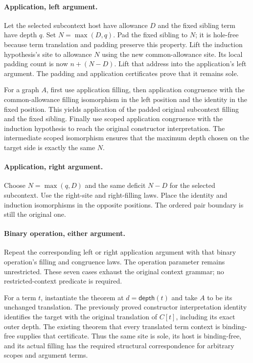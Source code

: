 \paragraph{Application, left argument.} Let the selected subcontext host have
allowance $D$ and the fixed sibling term have depth $q$. Set $N=\max(D,q)$.
Pad the fixed sibling to $N$; it is hole-free because term translation and
padding preserve this property. Lift the induction hypothesis's site to
allowance $N$ using the new common-allowance site. Its local padding count is
now $n+(N-D)$. Lift that address into the application's left argument. The
padding and application certificates prove that it remains sole.

For a graph $A$, first use application filling, then application congruence
with the common-allowance filling isomorphism in the left position and the
identity in the fixed position. This yields application of the padded original
subcontext filling and the fixed sibling. Finally use scoped application
congruence with the induction hypothesis to reach the original constructor
interpretation. The intermediate scoped isomorphism ensures that the maximum
depth chosen on the target side is exactly the same $N$.

\paragraph{Application, right argument.} Choose $N=\max(q,D)$ and the same
deficit $N-D$ for the selected subcontext. Use the right-site and right-filling
laws. Place the identity and induction isomorphisms in the opposite positions.
The ordered pair boundary is still the original one.

\paragraph{Binary operation, either argument.} Repeat the corresponding left
or right application argument with that binary operation's filling and
congruence laws. The operation parameter remains unrestricted. These seven
cases exhaust the original context grammar; no restricted-context predicate
is required.



For a term $t$, instantiate the theorem at $d=\mathsf{depth}(t)$ and take
$A$ to be its unchanged translation. The previously proved constructor
interpretation identity identifies the target with the original translation
of $C[t]$, including its exact outer depth. The existing theorem that every
translated term context is binding-free supplies that certificate. Thus the
same site is sole, its host is binding-free, and its actual filling has the
required structural correspondence for arbitrary scopes and argument terms.

